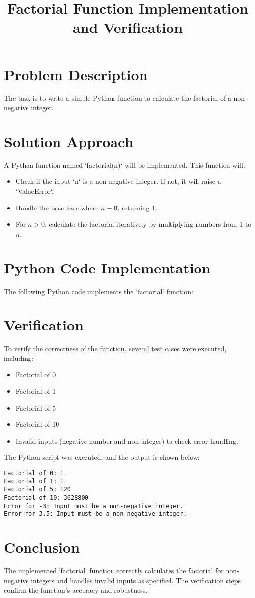 \documentclass{article}
\title{Factorial Function Implementation and Verification}
\author{}
\date{}
\begin{document}
\maketitle

\section*{Problem Description}
The task is to write a simple Python function to calculate the factorial of a non-negative integer.

\section*{Solution Approach}
A Python function named `factorial(n)` will be implemented. This function will:
\begin{itemize}
    \item Check if the input `n` is a non-negative integer. If not, it will raise a `ValueError`.
    \item Handle the base case where $n=0$, returning 1.
    \item For $n > 0$, calculate the factorial iteratively by multiplying numbers from 1 to $n$.
\end{itemize}

\section*{Python Code Implementation}
The following Python code implements the `factorial` function:



\section*{Verification}
To verify the correctness of the function, several test cases were executed, including:
\begin{itemize}
    \item Factorial of 0
    \item Factorial of 1
    \item Factorial of 5
    \item Factorial of 10
    \item Invalid inputs (negative number and non-integer) to check error handling.
\end{itemize}

The Python script was executed, and the output is shown below:

\begin{verbatim}
Factorial of 0: 1
Factorial of 1: 1
Factorial of 5: 120
Factorial of 10: 3628800
Error for -3: Input must be a non-negative integer.
Error for 3.5: Input must be a non-negative integer.
\end{verbatim}

\section*{Conclusion}
The implemented `factorial` function correctly calculates the factorial for non-negative integers and handles invalid inputs as specified. The verification steps confirm the function's accuracy and robustness.
\end{document}
